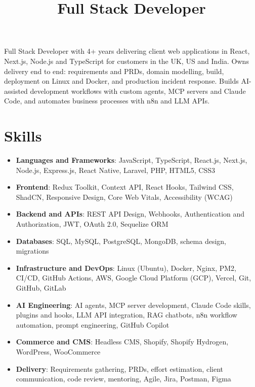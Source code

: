 \documentclass[11pt,a4paper,sans]{moderncv}
\title{Full Stack Developer}
\begin{document}
\makecvtitle


\vspace{6pt}
\small{Full Stack Developer with 4+ years delivering client web applications in React, Next.js, Node.js and TypeScript for customers in the UK, US and India. Owns delivery end to end: requirements and PRDs, domain modelling, build, deployment on Linux and Docker, and production incident response. Builds AI-assisted development workflows with custom agents, MCP servers and Claude Code, and automates business processes with n8n and LLM APIs.}


\section{Skills}
\vspace{1pt}
\begin{itemize}

\item \textbf{Languages and Frameworks}: JavaScript, TypeScript, React.js, Next.js, Node.js, Express.js, React Native, Laravel, PHP, HTML5, CSS3

\item \textbf{Frontend}: Redux Toolkit, Context API, React Hooks, Tailwind CSS, ShadCN, Responsive Design, Core Web Vitals, Accessibility (WCAG)

\item \textbf{Backend and APIs}: REST API Design, Webhooks, Authentication and Authorization, JWT, OAuth 2.0, Sequelize ORM

\item \textbf{Databases}: SQL, MySQL, PostgreSQL, MongoDB, schema design, migrations

\item \textbf{Infrastructure and DevOps}: Linux (Ubuntu), Docker, Nginx, PM2, CI/CD, GitHub Actions, AWS, Google Cloud Platform (GCP), Vercel, Git, GitHub, GitLab

\item \textbf{AI Engineering}: AI agents, MCP server development, Claude Code skills, plugins and hooks, LLM API integration, RAG chatbots, n8n workflow automation, prompt engineering, GitHub Copilot

\item \textbf{Commerce and CMS}: Headless CMS, Shopify, Shopify Hydrogen, WordPress, WooCommerce

\item \textbf{Delivery}: Requirements gathering, PRDs, effort estimation, client communication, code review, mentoring, Agile, Jira, Postman, Figma

\end{itemize}
\end{document}
